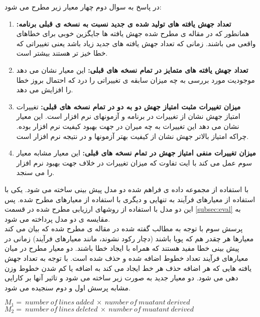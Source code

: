در پاسخ به سوال دوم چهار معیار زیر مطرح می شود:
\begin{enumerate}

	\item  
	\textbf{
	تعداد جهش یافته های تولید شده ی جدید نسبت به نسخه ی قبلی برنامه: }همانطور که در مقاله ی \cite{just2014mutants} مطرح شده جهش یافته ها جایگزین خوبی برای خطاهای واقعی می باشند. زمانی که تعداد جهش یافته های جدید زیاد باشد یعنی تغییراتی که خطا خیز تر هستند بیشتر است. 
	\item 
	\textbf{
	تعداد جهش یافته های متمایز در تمام نسخه های قبلی:} این معیار نشان می دهد موجودیت مورد بررسی به چه میزان سابقه ی تغییراتی را درد که احتمال بروز خطا را افزایش می دهد.
	
	\item 
	\textbf{
	میزان تغییرات مثبت امتیاز جهش دو به دو در تمام نسخه های قبلی:}
تغییرات امتیاز جهش نشان از تغییرات در برنامه و آزمونهای نرم افزار است.     این معیار نشان می دهد این تغییرات به چه میران در جهت بهبود کیفیت نرم افزار بوده. چراکه امتیاز بالاتر جهش نشان از کیفیت بهتر آزمونها و در نتیجه نرم افزار است. 
	\item 
	\textbf{
	میزان تغییرات منفی امتیاز جهش در تمام نسخه های قبلی:}
این معیار مشابه معیار سوم عمل می کند با ایت تفاوت که میزان تغییرات در خلاف جهت بهبود نرم افزار را می سنجد. 	
\end{enumerate}
با استفاده از مجموعه داده ی فراهم شده دو مدل پیش بینی ساخته می شود. یکی با استفاده از معیارهای فرآیند به تنهایی و دیگری با استفاده از معیارهای مطرح شده. پس این دو مدل با استفاده از روشهای ارزیابی مطرح شده در قسمت \ref{subsec:eval}  به مقایسه ی دو مدل پرداخته می شود.\\

پرسش سوم با توجه به مطالب گفته شده در مقاله ی \cite{rahman2013and} مطرح شده که بیان می کند معیارها هر چقدر هم که پویا باشند (دچار رکود نشوند، مانند معیارهای فرآیند) زمانی در پیش بینی خطا مفید هستند که همراه با ایجاد خطا باشند.  دو معیار مطرح در میان معیارهای فرآیند تعداد خطوط اضافه شده و حذف شده است. با توجه به تعداد جهش یافته هایی که هر اضافه حذف هر خط ایجاد می کند به اضافه یا کم شدن خطوط وزن دهی می شود. دو معیار جدید به صورت زیر ساخته می شود و تاثیر آنها بر کارایی مشابه پرسش اول و دوم سنجیده می شود. \\
\begin{latin}
	
	$M_1 =\ number\ of\ lines\ added\ \times \ number\ of\ muatant\ derived$\\
	
	$M_2 =\ number\ of\ lines\ deleted\ \times \ number\ of\ muatant\ derived$\\
\end{latin}



 